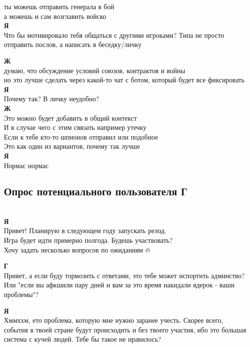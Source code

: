 ты можешь отправить генерала в бой\\

а можешь и сам возглавить войско\\

\textbf{Я} \\
Что бы мотивировало тебя общаться с другими игроками? Типа не просто отправить послов, а написать в беседку/личку

\textbf{Ж} \\
думаю, что обсуждение условий союзов, контрактов и войны\\

но это лучше сделать через какой-то чат с ботом, который будет все фиксировать\\

\textbf{Я} \\
Почему так? В личку неудобно?\\

\textbf{Ж} \\
Это можно будет добавить в общий контекст\\

И в случае чего с этим связать например утечку\\

Если к тебе кто-то шпионов отправил или подобное\\

Это как один из вариантов, почему так лучше\\

\textbf{Я} \\
Нормас нормас

\subsection{Опрос потенциального пользователя Г}\\
\textbf{Я} \\
Привет! Планирую в следующем году запускать релод. \\
Игра будет идти примерно полгода. Будешь участвовать? \\
Хочу задать несколько вопросов по ожиданиям 🔥🎅

\textbf{Г} \\
Привет, а если буду тормозить с ответами, это тебе может испортить админство? Или "если вы афкшили пару дней и вам за это время накидали ядерок - ваши проблемы"?

\textbf{Я} \\
Хммххм, ето проблема, которую мне нужно заранее учесть. Скорее всего, события в твоей стране будут происходить и без твоего участия, ибо это большая система с кучей людей. Тебе бы такое не нравилось?

